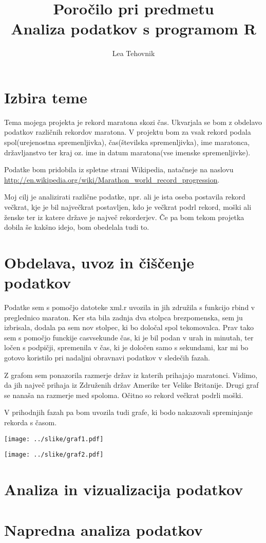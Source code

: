 \documentclass[11pt,a4paper]{article}
\begin{document}
\title{Poročilo pri predmetu \\
Analiza podatkov s programom R}
\author{Lea Tehovnik}
\maketitle

\section{Izbira teme}

Tema mojega projekta je rekord maratona skozi čas. Ukvarjala se bom z obdelavo podatkov različnih rekordov maratona. V projektu bom za vsak rekord podala spol(urejenostna spremenljivka), čas(številska spremenljivka), ime maratonca, državljanstvo ter kraj oz. ime in datum maratona(vse imenske spremenljivke).

Podatke bom pridobila iz spletne strani Wikipedia, natačneje na naslovu \url{http://en.wikipedia.org/wiki/Marathon_world_record_progression}.

Moj cilj je analizirati različne podatke, npr. ali je ista oseba postavila rekord večkrat, kje je bil največkrat postavljen, kdo je večkrat podrl rekord, moški ali ženske ter iz katere države je največ rekorderjev. Če pa bom tekom projetka dobila še kakšno idejo, bom obedelala tudi to.

\section{Obdelava, uvoz in čiščenje podatkov}

Podatke sem s pomočjo datoteke xml.r uvozila in jih združila s funkcijo rbind v preglednico maraton. Ker sta bila zadnja dva stolpca brezpomenska, sem ju izbrisala, dodala pa sem nov stolpec, ki bo določal spol tekomovalca. Prav tako sem s pomočjo funckije casvsekunde čas, ki je bil podan v urah in minutah, ter ločen s podpičji, spremenila v čas, ki je določen samo s sekundami, kar mi bo gotovo koristilo pri nadaljni obravnavi podatkov v sledečih fazah.

Z grafom sem ponazorila razmerje držav iz katerih prihajajo maratonci. Vidimo, da jih največ prihaja iz Združenih držav Amerike ter Velike Britanije.
Drugi graf se nanaša na razmerje med spoloma. Očitno so rekord večkrat podrli moški. 

V prihodnjih fazah pa bom uvozila tudi grafe, ki bodo nakazovali spreminjanje rekorda s časom.

\texttt{[image: ../slike/graf1.pdf]}

\texttt{[image: ../slike/graf2.pdf]}

\section{Analiza in vizualizacija podatkov}


\section{Napredna analiza podatkov}

\end{document}
